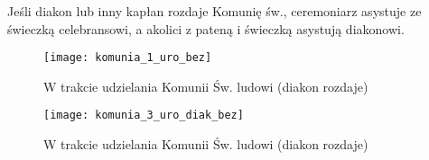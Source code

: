			Jeśli diakon lub inny kapłan rozdaje Komunię św., ceremoniarz asystuje ze świeczką celebransowi, a akolici z pateną i świeczką asystują diakonowi.
			
			\begin{figure}[ht]
				\centering
				\texttt{[image: komunia\_1\_uro\_bez]}
				\caption{W trakcie udzielania Komunii Św. ludowi (diakon rozdaje)}
				\label{fig:komunia_1_uro_bez}
			\end{figure}
		
			\begin{figure}[ht]
				\centering
				\texttt{[image: komunia\_3\_uro\_diak\_bez]}
				\caption{W trakcie udzielania Komunii Św. ludowi (diakon rozdaje)}
				\label{fig:komunia_3_uro_diak_bez}
			\end{figure}
	
	\clearpage
 